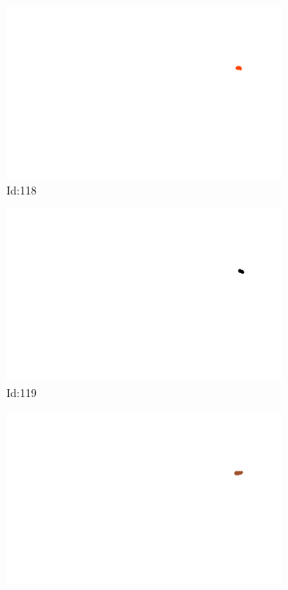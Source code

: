 \documentclass[12pt,twoside]{report}
\begin{document}
\begin{figure}
\centering
\begin{subfigure}[b]{0.20\textwidth}
\centering
\includegraphics[width=\textwidth]{../../trajectories/118.png}
\caption{Id:118}
\end{subfigure}
\begin{subfigure}[b]{0.20\textwidth}
\centering
\includegraphics[width=\textwidth]{../../trajectories/119.png}
\caption{Id:119}
\end{subfigure}
\begin{subfigure}[b]{0.20\textwidth}
\centering
\includegraphics[width=\textwidth]{../../trajectories/121.png}

\end{subfigure}
\end{figure}
\end{document}
